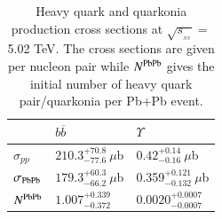 %
%




\begin{table}
  \begin{center}
\caption[]{Heavy quark and quarkonia production  cross sections at
$\sqrt{s_{_{_{NN}}}}=$ 5.02 TeV. The cross sections are given per nucleon pair while
$N^{\rm PbPb}$ gives the initial number of heavy quark pair/quarkonia per Pb+Pb event.}
\label{NLOcros}
\begin{tabular}{l|l|l} 
\hline 
\hline
                        & $ b \overline b$                    & $\Upsilon$   \\              
\hline
$\sigma_{pp}$            & $210.3^{+70.8}_{-77.6}~\mu$b            & $0.42^{+0.14}_{-0.16}~\mu$b  \\


$\sigma_{\rm PbPb}$        & $179.3^{+60.3}_{-66.2}~\mu$b             & 0.359$^{+0.121}_{-0.132}~\mu$b  \\



$N^{\rm PbPb}$              & $1.007^{+0.339}_{-0.372}$               & $0.0020^{+0.0007}_{-0.0007}$   \\

\hline
\hline
\end{tabular}
\end{center}
\end{table}


